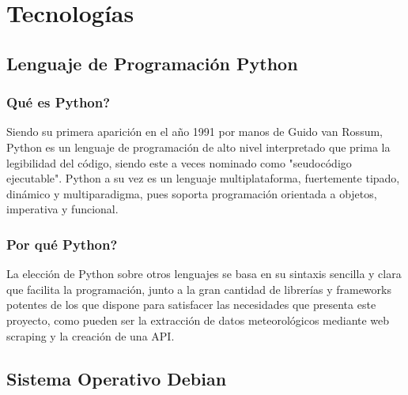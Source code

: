 \chapter[Tecnologías]{Tecnologías}
\label{Chap2}

\section{Lenguaje de Programación Python}

\subsection{Qué es Python?}
Siendo su primera aparición en el año 1991 por manos de Guido van Rossum, Python es un lenguaje de programación de alto nivel interpretado que prima la legibilidad del código, siendo este a veces nominado como "seudocódigo ejecutable". \cite{dierbach2014python}
\newline
\newline
Python a su vez es un lenguaje multiplataforma, fuertemente tipado, dinámico y multiparadigma, pues soporta programación orientada a objetos, imperativa y funcional. \cite{PyDoc} \cite{borges2014python}

\subsection{Por qué Python?}
La elección de Python sobre otros lenguajes se basa en su sintaxis sencilla y clara que facilita la programación, junto a la gran cantidad de librerías y frameworks potentes de los que dispone para satisfacer las necesidades que presenta este proyecto, como pueden ser la extracción de datos meteorológicos mediante web scraping y la creación de una API.

\newpage

\section{Sistema Operativo Debian}

